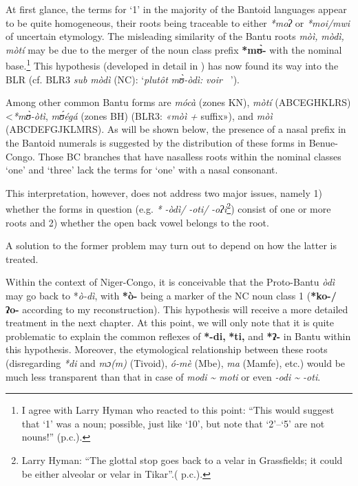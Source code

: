 At first glance, the terms for `1' in the majority of the Bantoid languages appear to be quite homogeneous, their roots being traceable to either \textit{*moʔ} or \textit{*moi/mwi} of uncertain etymology. The misleading similarity of the Bantu roots \textit{mòì,} \textit{mòdì,} \textit{mòtí} may be due to the merger of the noun class prefix \textbf{*m{\`{ʊ}}-} with the nominal base.\footnote{I agree with Larry Hyman who reacted to this point: “This would suggest that ‘1’ was a noun; possible, just like ‘10’, but note that `2'--`5' are not nouns!” (p.c.).} This hypothesis (developed in detail in \citealt{Vanhoudt1994}) has now found its way into the BLR (cf. BLR3 \textit{sub} \textit{mòdì} (NC): ‘\textit{plutôt} \textit{m{\`{ʊ}}-òdì:} \textit{voir} \textit{\citealt{Vanhoudt1994}~}’). 

Among other common Bantu forms are \textit{mócà} (zones KN), \textit{mòtí} (ABCEGHKLRS) <\textit{*m{\`{ʊ}}-òtì}, \textit{m{\'{ʊ}}égá} (zones BH) (BLR3: \textit{«mòì} \textit{+}  {suffix»}), and \textit{mòì} (ABCDEFGJKLMRS). As will be shown below, the presence of a nasal prefix in the Bantoid numerals is suggested by the distribution of these forms in Benue-Congo. Those BC branches that have nasalless roots within the nominal classes ‘one’ and ‘three’ lack the terms for ‘one’ with a nasal consonant. 

This interpretation, however, does not address two major issues, namely 1) whether the forms in question (e.g. \textit{*} \textit{-òdì/} \textit{-oti/} \textit{-oʔi}\footnote{Larry Hyman: “The glottal stop goes back to a velar in Grassfields; it could be either alveolar or velar in Tikar”.( p.c.).}) consist of one or more roots and 2) whether the open back vowel belongs to the root. 

A solution to the former problem may turn out to depend on how the latter is treated.

Within the context of Niger-Congo, it is conceivable that the Proto-Bantu \textit{òdì} may go back to *\textit{ò-dì}, with \textbf{*ò-} being a marker of the NC noun class 1 (\textbf{*ko-/} \textbf{ʔo-} according to my reconstruction). This hypothesis will receive a more detailed treatment in the next chapter. At this point, we will only note that it is quite problematic to explain the common reflexes of \textbf{*-di,} \textbf{*ti,} and \textbf{*ʔ-} in Bantu within this hypothesis. Moreover, the etymological relationship between these roots (disregarding \textit{*di} and \textit{mɔ(m)} (Tivoid), \textit{ó-mè} (Mbe), \textit{ma} (Mamfe), etc.) would be much less transparent than that in case of \textit{modi} \textit{{\textasciitilde} moti} or even \textit{-odi {\textasciitilde} -oti}.

